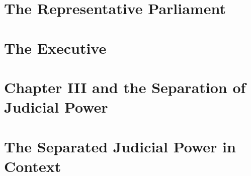 \documentclass[12pt]{book}
\begin{document}
\chapter{The Representative Parliament}


\chapter{The Executive}


\chapter{Chapter III and the Separation of Judicial Power}


\chapter{The Separated Judicial Power in Context}


% 

% 


\end{document}
